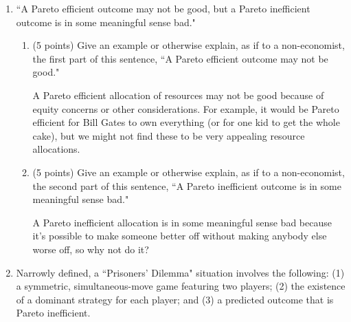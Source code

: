 \documentclass{article}
\begin{document}
\begin{enumerate}
\item \begin{EXAM} ``A Pareto efficient outcome may not be good, but a Pareto inefficient outcome is in some meaningful sense bad."\end{EXAM}

    \begin{enumerate}
    \item \begin{EXAM} (5 points) Give an example or otherwise explain, as if to a non-economist, the first part of this sentence, ``A Pareto efficient outcome may not be good." \vspace{1.7in}\end{EXAM}

\begin{KEY}
A Pareto efficient allocation of resources may not be good because of equity concerns or other considerations. For example, it would be Pareto efficient for Bill Gates to own everything (or for one kid to get the whole cake), but we might not find these to be very appealing resource allocations.
\end{KEY}


    \item \begin{EXAM} (5 points) Give an example or otherwise explain, as if to a non-economist, the second part of this sentence, ``A Pareto inefficient outcome is in some meaningful sense bad." \vspace{1.7in} \end{EXAM}

\begin{KEY}
A Pareto inefficient allocation is in some meaningful sense bad because it's possible to make someone better off without making anybody else worse off, so why not do it?
\end{KEY}

    \end{enumerate}




\item \begin{EXAM} Narrowly defined, a ``Prisoners' Dilemma" situation involves the following: (1) a symmetric, simultaneous-move game featuring two players; (2) the existence of a dominant strategy for each player; and (3) a predicted outcome that is Pareto inefficient.  \end{EXAM}

    \begin{enumerate}


\end{enumerate}
\end{enumerate}
\end{document}
